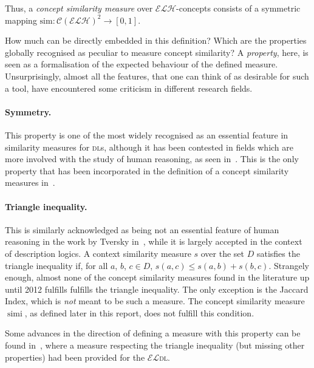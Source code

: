 \documentclass{llncs}
\DeclareMathOperator{\simi}{simi}
\newcommand{\el}{\(\mathcal{EL}\)\xspace}
\newcommand{\elh}{\(\mathcal{ELH}\)\xspace}
\newcommand{\dl}{\textsc{dl}\xspace}
\begin{document}
  Thus, a \emph{concept similarity measure} over \elh-concepts consists of a symmetric mapping \(\mathrm{sim} \colon {\mathcal{C}(\mathcal{ELH})}^2 \to [0,1]\).

  How much can be directly embedded in this definition?
  Which are the properties globally recognised as peculiar to measure concept similarity?
  A \emph{property}, here, is seen as a formalisation of the expected behaviour of the defined measure.
  Unsurprisingly, almost all the features, that one can think of as desirable for such a tool, have encountered some criticism in different research fields.

  \paragraph{Symmetry.} This property is one of the most widely recognised as an essential feature in similarity measures for \dl{}s, although it has been contested in fields which are more involved with the study of human reasoning, as seen in~\cite{Tve77}.
  This is the only property that has been incorporated in the definition of a concept similarity measures in~\cite{LeTu12}.

  \paragraph{Triangle inequality.} This is similarly acknowledged as being not an essential feature of human reasoning in the work by Tversky in~\cite{Tve77}, while it is largely accepted in the context of description logics.
  A context similarity measure \(s\) over the set \(D\) satisfies the triangle inequality if, for all \(a\), \(b\), \(c \in D\),
  \(s(a,c) \le s(a,b) + s(b,c)\).
  Strangely enough, almost none of the concept similarity measures found in the literature up until 2012 fulfills fulfills the triangle inequality.
  The only exception is the Jaccard Index, which is \emph{not} meant to be such a measure.
  The concept similarity measure \(\simi\), as defined later in this report, does not fulfill this condition.

  Some advances in the direction of defining a measure with this property can be found in~\cite{DAB14}, where a measure respecting the triangle inequality (but missing other properties) had been provided for the \el \dl.
\end{document}
